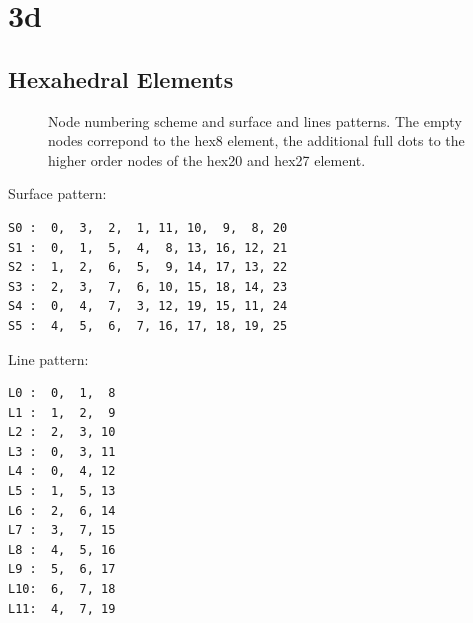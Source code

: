 \section{3d}
\subsection{Hexahedral Elements}

\begin{figure}[h!]
\begin{center}
\caption{Node numbering scheme and surface and lines patterns. The empty nodes correpond to the hex8 element, the additional full dots to the higher order nodes of the hex20 and hex27 element.}
\label{fig:conventions:hex}
\end{center}
\end{figure}

Surface pattern:
\begin{verbatim}
S0 :  0,  3,  2,  1, 11, 10,  9,  8, 20
S1 :  0,  1,  5,  4,  8, 13, 16, 12, 21
S2 :  1,  2,  6,  5,  9, 14, 17, 13, 22
S3 :  2,  3,  7,  6, 10, 15, 18, 14, 23
S4 :  0,  4,  7,  3, 12, 19, 15, 11, 24
S5 :  4,  5,  6,  7, 16, 17, 18, 19, 25
\end{verbatim}

Line pattern:
\begin{verbatim}
L0 :  0,  1,  8
L1 :  1,  2,  9
L2 :  2,  3, 10
L3 :  0,  3, 11
L4 :  0,  4, 12
L5 :  1,  5, 13
L6 :  2,  6, 14
L7 :  3,  7, 15
L8 :  4,  5, 16
L9 :  5,  6, 17
L10:  6,  7, 18
L11:  4,  7, 19
\end{verbatim}

